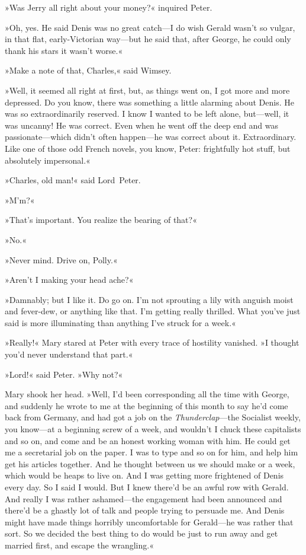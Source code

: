 »Was Jerry all right about your money?« inquired Peter.

»Oh, yes. He said Denis was no great catch—I do wish Gerald wasn't so vulgar, in that flat, early-Victorian way—but he said that, after George, he could only thank his stars it wasn't worse.«

»Make a note of that, Charles,« said Wimsey.

»Well, it seemed all right at first, but, as things went on, I got more and more depressed. Do you know, there was something a little alarming about Denis. He was so extraordinarily reserved. I know I wanted to be left alone, but—well, it was uncanny! He was correct. Even when he went off the deep end and was passionate—which didn't often happen—he was correct about it. Extraordinary. Like one of those odd French novels, you know, Peter: frightfully hot stuff, but absolutely impersonal.«

»Charles, old man!« said Lord~Peter.

»M'm?«

»That's important. You realize the bearing of that?«

»No.«

»Never mind. Drive on, Polly.«

»Aren't I making your head ache?«

»Damnably; but I like it. Do go on. I'm not sprouting a lily with anguish moist and fever-dew, or anything like that. I'm getting really thrilled. What you've just said is more illuminating than anything I've struck for a week.«

»Really!« Mary stared at Peter with every trace of hostility vanished.  »I thought you'd never understand that part.«

»Lord!« said Peter. »Why not?«

Mary shook her head. »Well, I'd been corresponding all the time with George, and suddenly he wrote to me at the beginning of this month to say he'd come back from Germany, and had got a job on the \textit{Thunderclap}—the Socialist weekly, you know—at a beginning screw of  a week, and wouldn't I chuck these capitalists and so on, and come and be an honest working woman with him. He could get me a secretarial job on the paper. I was to type and so on for him, and help him get his articles together. And he thought between us we should make  or  a week, which would be heaps to live on. And I was getting more frightened of Denis every day. So I said I would. But I knew there'd be an awful row with Gerald. And really I was rather ashamed—the engagement had been announced and there'd be a ghastly lot of talk and people trying to persuade me. And Denis might have made things horribly uncomfortable for Gerald—he was rather that sort. So we decided the best thing to do would be just to run away and get married first, and escape the wrangling.«

